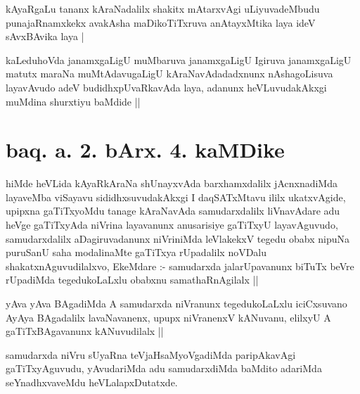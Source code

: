 
\begin{artha}
kAyaRgaLu tananx kAraNadalilx shakitx mAtarxvAgi uLiyuvadeMbudu punajaRnamxkekx avakAsha maDikoTiTxruva anAtayxMtika laya ideV sAvxBAvika laya |
\end{artha}


\begin{artha}
kaLeduhoVda janamxgaLigU muMbaruva janamxgaLigU Igiruva janamxgaLigU matutx maraNa muMtAdavugaLigU kAraNavAdadadxnunx nAshagoLisuva layavAvudo adeV budidhxpUvaRkavAda laya, adanunx heVLuvudakAkxgi muMdina shurxtiyu baMdide ||
\end{artha}

\section*{baq. a. 2. bArx. 4. kaMDike}

\begin{artha}
hiMde heVLida kAyaRkAraNa shUnayxvAda barxhamxdalilx jAcnxnadiMda layaveMba viSayavu sididhxsuvudakAkxgi I daqSATxMtavu ililx ukatxvAgide, upipxna gaTiTxyoMdu tanage kAraNavAda samudarxdalilx liVnavAdare adu heVge gaTiTxyAda niVrina layavanunx anusarisiye gaTiTxyU layavAguvudo, samudarxdalilx aDagiruvadanunx niVriniMda leVlakekxV tegedu obabx nipuNa puruSanU saha modalinaMte gaTiTxya rUpadalilx noVDalu shakatxnAguvudilalxvo, EkeMdare :- samudarxda jalarUpavanunx biTuTx beVre rUpadiMda tegedukoLaLxlu obabxnu samathaRnAgilalx ||
\end{artha}


\begin{artha}
yAva yAva BAgadiMda A samudarxda niVranunx tegedukoLaLxlu iciCxsuvano AyAya BAgadalilx lavaNavanenx, upupx niVranenxV kANuvanu, elilxyU A gaTiTxBAgavanunx kANuvudilalx ||
\end{artha}


\begin{artha}
samudarxda niVru sUyaRna teVjaHsaMyoVgadiMda paripAkavAgi gaTiTxyAguvudu, yAvudariMda adu samudarxdiMda baMdito adariMda seYnadhxvaveMdu heVLalapxDutatxde.
\end{artha}

